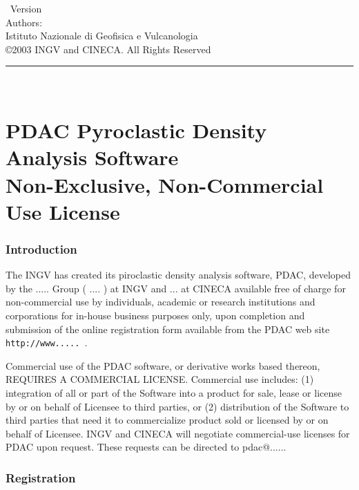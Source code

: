 
\thispagestyle{empty}

\vspace*{0.1in}

\begin{centering}
{\LARGE \PDAC\ Version \PDACVERSION}\\
\bigskip
{\large Authors: \PDACAUTHORS} \\
\medskip
{\large Istituto Nazionale di Geofisica e Vulcanologia } \\
\bigskip
{\large \copyright 2003 INGV and CINECA.
All Rights Reserved} \\
\bigskip
\end{centering}

  \rule{6in}{0.04in}				\\	\vspace{0.25in}

\section*{PDAC Pyroclastic Density Analysis Software \\
Non-Exclusive, Non-Commercial Use License}

\subsubsection*{Introduction}

The INGV has created its piroclastic density analysis
software, PDAC, developed by the ..... 
Group ( .... ) at INGV and ... at CINECA available free of charge for
non-commercial use by individuals, academic or research institutions and
corporations for in-house business purposes only, upon completion and
submission of the online registration form available from the PDAC web
site {\tt http://www..... }.

Commercial use of the PDAC software, or derivative works based thereon,
REQUIRES A COMMERCIAL LICENSE. Commercial use includes: 
(1) integration of all or part of the Software into a product for sale, 
lease or license by or on behalf of Licensee to third parties, or 
(2) distribution of the Software to third parties that need it to 
commercialize product sold or licensed by or on behalf of Licensee.  
INGV and CINECA will negotiate commercial-use licenses for 
PDAC upon request. These requests can be directed to pdac@......

\subsubsection*{Registration}

